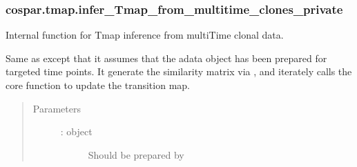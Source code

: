 \documentclass[letterpaper,10pt,english]{sphinxmanual}
\begin{document}
\subsubsection{cospar.tmap.infer\_Tmap\_from\_multitime\_clones\_private}
\label{\detokenize{cospar.tmap.infer_Tmap_from_multitime_clones_private:cospar-tmap-infer-tmap-from-multitime-clones-private}}\label{\detokenize{cospar.tmap.infer_Tmap_from_multitime_clones_private::doc}}

\begin{fulllineitems}
\label{\detokenize{cospar.tmap.infer_Tmap_from_multitime_clones_private:cospar.tmap.infer_Tmap_from_multitime_clones_private}}
Internal function for Tmap inference from multiTime clonal data.

Same as {\hyperref[\detokenize{cospar.tmap.infer_Tmap_from_multitime_clones:cospar.tmap.infer_Tmap_from_multitime_clones}]{}} except that it
assumes that the adata object has been prepared for targeted
time points. It generate the similarity matrix
via {\hyperref[\detokenize{cospar.tmap.generate_similarity_matrix:cospar.tmap.generate_similarity_matrix}]{}}, and iterately calls
the core function {\hyperref[\detokenize{cospar.tmap.refine_Tmap_through_cospar:cospar.tmap.refine_Tmap_through_cospar}]{}} to update
the transition map.
\begin{quote}\begin{description}
\item[{Parameters}] \leavevmode\begin{description}
\item[{ :  object}] \leavevmode
Should be prepared by {\hyperref[\detokenize{cospar.tmap.select_time_points:cospar.tmap.select_time_points}]{}}


\end{description}
\end{description}
\end{quote}
\end{fulllineitems}
\end{document}
